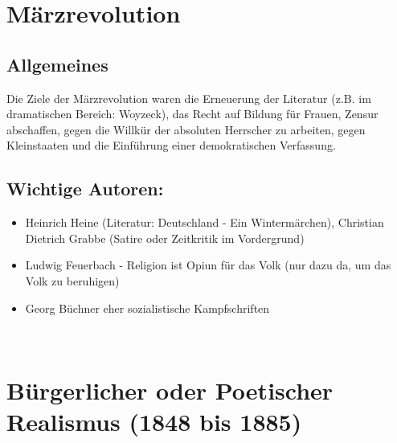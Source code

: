 \documentclass[12pt,a4paper]{article}
\begin{document}
\newpage

\section{Märzrevolution}

\subsection{Allgemeines}
Die Ziele der Märzrevolution waren die Erneuerung der Literatur (z.B. im dramatischen Bereich: Woyzeck), das Recht auf Bildung für Frauen, Zensur abschaffen, gegen die Willkür der absoluten Herrscher zu arbeiten, gegen Kleinstaaten und die Einführung einer demokratischen Verfassung.
\newline
\newline
\subsection{Wichtige Autoren:}

	\begin{itemize}
	\item Heinrich Heine (Literatur: Deutschland - Ein Wintermärchen), Christian Dietrich Grabbe (Satire oder Zeitkritik im Vordergrund)
	\item Ludwig Feuerbach - Religion ist Opiun für das Volk (nur dazu da, um das Volk zu beruhigen)
	\item Georg Büchner eher sozialistische Kampfschriften
	\end{itemize}\

\newpage

\section{Bürgerlicher oder Poetischer Realismus (1848 bis 1885)}
\end{document}
